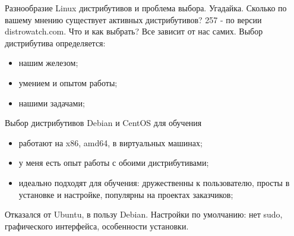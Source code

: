 \begin{frame}{Разнообразие Linux дистрибутивов и проблема выбора.}
    Угадайка. Сколько по вашему мнению существует активных дистрибутивов? 
    \pause
    \alert{257} - по версии distrowatch.com. \break 
    Что и как выбрать? \pause 
    \break
Все зависит от нас самих.  \break
    Выбор дистрибутива определяется:
	\begin{itemize}
            \item нашим железом;
            \item умением и опытом работы;
            \item нашими задачами;
	\end{itemize}
\end{frame}

\begin{frame}{Выбор дистрибутивов Debian и CentOS для обучения}
	\begin{itemize}
            \item работают на x86, amd64, в виртуальных машинах;
            \item у меня есть опыт работы с обоими дистрибутивами; 
            \item идеально подходят для обучения: дружественны к пользователю, просты в установке и настройке, популярны на проектах заказчиков;
	\end{itemize}
 Отказался от Ubuntu, в пользу Debian. Настройки по умолчанию: нет sudo, графического интерфейса, особенности установки.
\end{frame}
